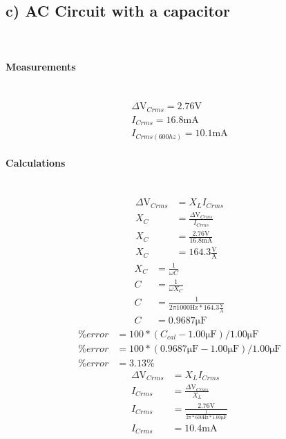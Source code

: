 \documentclass{report}
\begin{document}
\subsection*{c) AC Circuit with a capacitor}\mbox{}\\
\paragraph{Measurements}\mbox{}\\
\begin{gather}
    \Delta\si{\volt}_{Crms}=2.76\si{\volt}\\
    I_{Crms}=16.8\si{\milli\ampere}\\
    I_{Crms(600hz)}=10.1\si{\milli\ampere}
\end{gather}
\paragraph{Calculations}\mbox{}\\
\begin{align}
    \Delta\si{\volt}_{Crms}&=X_{L}I_{Crms}\nonumber\\
    X_{C}&=\frac{\Delta\si{\volt}_{Crms}}{I_{Crms}}\nonumber\\
    X_{C}&=\frac{2.76\si{\volt}}{16.8\si{\milli\ampere}}\nonumber\\
    X_{C}&=164.3\frac{\si{\volt}}{\si{\ampere}}\label{eq:xccalc}
\end{align}
\begin{align}
    X_{C}&=\frac{1}{\omega C}\nonumber\\
    C&=\frac{1}{\omega X_{C}}\nonumber\\
    C&=\frac{1}{2\pi1000\si{\hertz}*164.3\frac{\si{\volt}}{\si{\ampere}}}\nonumber\\
    C&=0.9687\si{\micro\farad}
\end{align}
\begin{align}
    \%error&=100 * (C_{cal} - 1.00\si{\micro\farad})/1.00\si{\micro\farad}\nonumber\\
    \%error&=100 * (0.9687\si{\micro\farad} - 1.00\si{\micro\farad})/1.00\si{\micro\farad}\nonumber\\
    \%error&=3.13\%
\end{align}
\begin{align}
    \Delta\si{\volt}_{Crms}&=X_{L}I_{Crms}\nonumber\\
    I_{Crms}&=\frac{\Delta\si{\volt}_{Crms}}{X_{L}}\nonumber\\
    I_{Crms}&=\frac{2.76\si{\volt}}{\frac{1}{2\pi*600\si{\hertz}*1.00\si{\micro\farad}}}\nonumber\\
    I_{Crms}&=10.4\si{\milli\ampere}\label{eq:icrmscalc}
\end{align}
\end{document}
